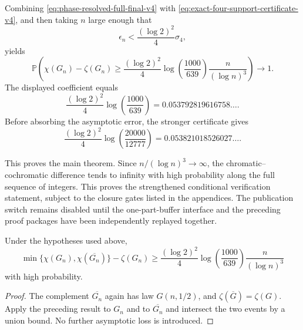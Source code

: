 Combining \eqref{eq:phase-resolved-full-final-v4} with
\eqref{eq:exact-four-support-certificate-v4}, and then taking $n$ large enough
that
\[
  \epsilon_n<\frac{(\log 2)^2}{4}\sigma_4,
\]
yields
\[
  \mathbb P\!\left(
    \chi(G_n)-\zeta(G_n)
    \ge
    \frac{(\log 2)^2}{4}
    \log\!\left(\frac{1000}{639}\right)
    \frac{n}{(\log n)^3}
  \right)
  \longrightarrow1.
\]
The displayed coefficient equals
\[
  \frac{(\log 2)^2}{4}
  \log\!\left(\frac{1000}{639}\right)
  =0.053792819616758\ldots.
\]
Before absorbing the asymptotic error, the stronger certificate gives
\[
  \frac{(\log 2)^2}{4}
  \log\!\left(\frac{20000}{12777}\right)
  =0.053821018526027\ldots.
\]

\ifErdosProofClosed
This proves the main theorem. Since $n/(\log n)^3\to\infty$, the
chromatic--cochromatic difference tends to infinity with high probability
along the full sequence of integers.
\else
This proves the strengthened conditional verification statement, subject to
the closure gates listed in the appendices. The publication switch remains
disabled until the one-part-buffer interface and the preceding proof packages
have been independently replayed together.
\fi

\begin{corollary}
Under the hypotheses used above,
\[
  \min\{\chi(G_n),\chi(\overline{G_n})\}-\zeta(G_n)
  \ge
  \frac{(\log 2)^2}{4}
  \log\!\left(\frac{1000}{639}\right)
  \frac{n}{(\log n)^3}
\]
with high probability.
\end{corollary}

\begin{proof}
The complement $\overline{G_n}$ again has law $G(n,1/2)$, and
$\zeta(\overline G)=\zeta(G)$. Apply the preceding result to $G_n$ and to
$\overline{G_n}$ and intersect the two events by a union bound. No further
asymptotic loss is introduced.
\end{proof}
